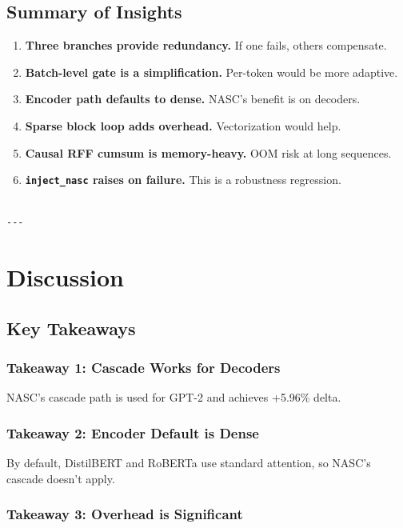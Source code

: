 \subsection{Summary of Insights}

\begin{enumerate}
\item \textbf{Three branches provide redundancy.} If one fails, others compensate.
\item \textbf{Batch-level gate is a simplification.} Per-token would be more
  adaptive.
\item \textbf{Encoder path defaults to dense.} NASC's benefit is on decoders.
\item \textbf{Sparse block loop adds overhead.} Vectorization would help.
\item \textbf{Causal RFF cumsum is memory-heavy.} OOM risk at long sequences.
\item \textbf{\texttt{inject\_nasc} raises on failure.} This is a robustness regression.
\end{enumerate}
\begin{lstlisting}

---
\end{lstlisting}


\section{Discussion}

\subsection{Key Takeaways}

\subsubsection{Takeaway 1: Cascade Works for Decoders}

NASC's cascade path is used for GPT-2 and achieves +5.96\% delta.

\subsubsection{Takeaway 2: Encoder Default is Dense}

By default, DistilBERT and RoBERTa use standard attention, so NASC's 
cascade doesn't apply.

\subsubsection{Takeaway 3: Overhead is Significant}

